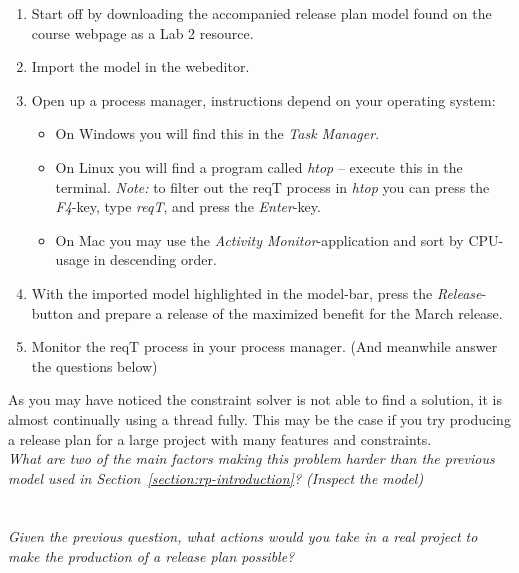 \documentclass[11pt]{article}
\begin{document}
\begin{enumerate}
    \item Start off by downloading the accompanied release plan model found on the course webpage as a Lab 2 resource.
    
    \item Import the model in the webeditor.
    
    \item Open up a process manager, instructions depend on your operating system:
    \begin{itemize}
        \item On Windows you will find this in the \textit{Task Manager}.
        \item On Linux you will find a program called \textit{htop} -- execute this in the terminal.
        \textit{Note:} to filter out the reqT process in \textit{htop} you can press the \textit{F4}-key, type \textit{reqT}, and press the \textit{Enter}-key.
        \item On Mac you may use the \textit{Activity Monitor}-application and sort by CPU-usage in descending order.
    \end{itemize}  
        
    
    \item With the imported model highlighted in the model-bar, press the \textit{Release}-button and prepare a release of the maximized benefit for the March release.
    
    \item Monitor the reqT process in your process manager. (And meanwhile answer the questions below)
\end{enumerate}

As you may have noticed the constraint solver is not able to find a solution, it is almost continually using a thread fully. This may be the case if you try producing a release plan for a large project with many features and constraints.\\

\noindent\textit{What are two of the main factors making this problem harder than the previous model used in Section~\ref{section:rp-introduction}? (Inspect the model)}\\ \\
\underline{\hspace{0.9\textwidth}}\\

\noindent\textit{Given the previous question, what actions would you take in a real project to make the production of a release plan possible?}\\ \\
\underline{\hspace{0.9\textwidth}}\\
\end{document}
